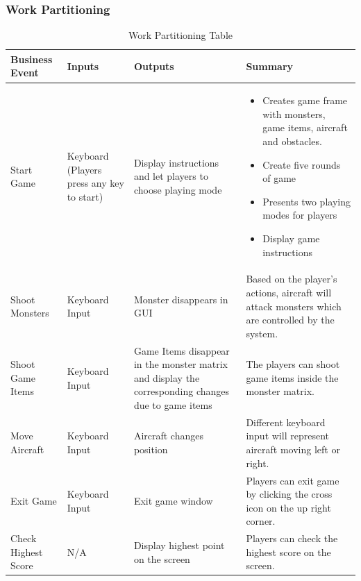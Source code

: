 \documentclass[12pt]{article}
\begin{document}
\subsubsection{Work Partitioning}
\begin{table}[h!]
\centering
\begin{tabular}{| p{3.5cm} | p{3cm} | p{3cm}| p{8cm}|}
\hline
\textbf{Business Event} & \textbf{Inputs} & \textbf{Outputs}&\textbf{Summary}\\
\hline
Start Game& Keyboard (Players press any key to start) & Display instructions and let players to choose playing mode & 
\begin{itemize}
\item Creates game frame with monsters, game items, aircraft and obstacles.
\item Create five rounds of game
\item Presents two playing modes for players
\item Display game instructions
\end{itemize}
\\
\hline
Shoot Monsters & Keyboard Input & Monster disappears in GUI & Based on the player's actions, aircraft will attack 
monsters which are controlled by the system.\\
\hline
Shoot Game Items & Keyboard Input & Game Items disappear in the monster matrix and display the corresponding changes due to game items & The players can shoot game items inside the
monster matrix.\\
\hline
Move Aircraft & Keyboard Input & Aircraft changes position & 
Different keyboard input will represent aircraft moving left
or right.\\
\hline
Exit Game & Keyboard Input & Exit game window & Players can
exit game by clicking the cross icon on the up right
corner.\\
\hline
Check Highest Score & N/A & 
Display highest point on the screen & Players can 
check the highest score on the screen.\\
\hline
\end{tabular}
\caption{Work Partitioning Table}
\end{table}
\newpage
\end{document}
